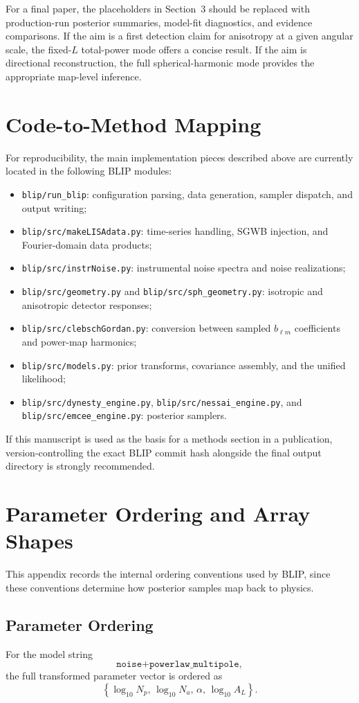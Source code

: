 \documentclass[11pt]{article}
\begin{document}
For a final paper, the placeholders in Section~3 should be replaced with production-run posterior summaries, model-fit diagnostics, and evidence comparisons. If the aim is a first detection claim for anisotropy at a given angular scale, the fixed-$L$ total-power mode offers a concise result. If the aim is directional reconstruction, the full spherical-harmonic mode provides the appropriate map-level inference.

\appendix
\section{Code-to-Method Mapping}
For reproducibility, the main implementation pieces described above are currently located in the following BLIP modules:
\begin{itemize}
\item \texttt{blip/run\_blip}: configuration parsing, data generation, sampler dispatch, and output writing;
\item \texttt{blip/src/makeLISAdata.py}: time-series handling, SGWB injection, and Fourier-domain data products;
\item \texttt{blip/src/instrNoise.py}: instrumental noise spectra and noise realizations;
\item \texttt{blip/src/geometry.py} and \texttt{blip/src/sph\_geometry.py}: isotropic and anisotropic detector responses;
\item \texttt{blip/src/clebschGordan.py}: conversion between sampled $b_{\ell m}$ coefficients and power-map harmonics;
\item \texttt{blip/src/models.py}: prior transforms, covariance assembly, and the unified likelihood;
\item \texttt{blip/src/dynesty\_engine.py}, \texttt{blip/src/nessai\_engine.py}, and \texttt{blip/src/emcee\_engine.py}: posterior samplers.
\end{itemize}
If this manuscript is used as the basis for a methods section in a publication, version-controlling the exact BLIP commit hash alongside the final output directory is strongly recommended.

\section{Parameter Ordering and Array Shapes}
This appendix records the internal ordering conventions used by BLIP, since these conventions determine how posterior samples map back to physics.

\subsection{Parameter Ordering}
For the model string
\begin{equation}
\texttt{noise+powerlaw\_multipole},
\end{equation}
the full transformed parameter vector is ordered as
\begin{equation}
\left\{
\log_{10}N_p,\,
\log_{10}N_a,\,
\alpha,\,
\log_{10}A_L
\right\}.
\end{equation}
\end{document}
